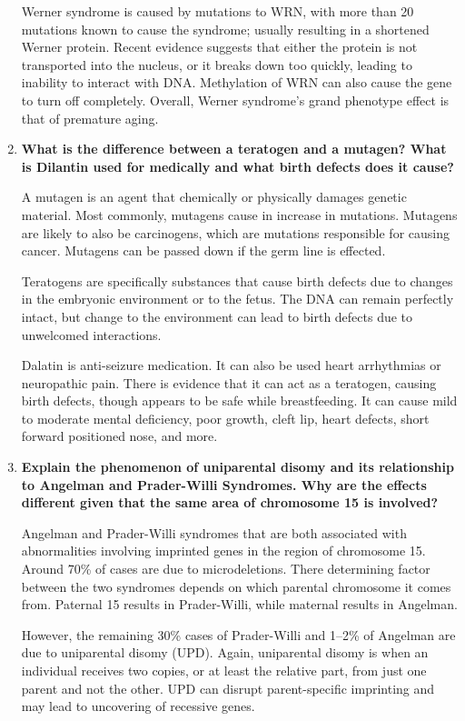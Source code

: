 \documentclass[plain,basic]{inVerba-notes}
\begin{document}
\begin{enumerate}
    Werner syndrome is caused by mutations to WRN, with more than 20 mutations known to cause the syndrome; usually resulting in a shortened Werner protein. Recent evidence suggests that either the protein is not transported into the nucleus, or it breaks down too quickly, leading to inability to interact with DNA\@. Methylation of WRN can also cause the gene to turn off completely. Overall, Werner syndrome's grand phenotype effect is that of premature aging.

    \qquad

    \item \textbf{What is the difference between a teratogen and a mutagen? What is Dilantin used for medically and what birth defects does it cause?}
    
    A mutagen is an agent that chemically or physically damages genetic material. Most commonly, mutagens cause in increase in mutations. Mutagens are likely to also be carcinogens, which are mutations responsible for causing cancer. Mutagens can be passed down if the germ line is effected. 

    Teratogens are specifically substances that cause birth defects due to changes in the embryonic environment or to the fetus. The DNA can remain perfectly intact, but change to the environment can lead to birth defects due to unwelcomed interactions. 

    Dalatin is anti-seizure medication. It can also be used heart arrhythmias or neuropathic pain. There is evidence that it can act as a teratogen, causing birth defects, though appears to be safe while breastfeeding. It can cause mild to moderate mental deficiency, poor growth, cleft lip, heart defects, short forward positioned nose, and more.

    \item \textbf{Explain the phenomenon of uniparental disomy and its relationship to Angelman and Prader-Willi Syndromes. Why are the effects different given that the same area of chromosome 15 is involved?}
    
    Angelman and Prader-Willi syndromes that are both associated with abnormalities involving imprinted genes in the region of chromosome 15. Around 70\% of cases are due to microdeletions. There determining factor between the two syndromes depends on which parental chromosome it comes from. Paternal 15 results in Prader-Willi, while maternal results in Angelman.

    However, the remaining 30\% cases of Prader-Willi and 1--2\% of Angelman are due to uniparental disomy (UPD). Again, uniparental disomy is when an individual receives two copies, or at least the relative part, from just one parent and not the other. UPD can disrupt parent-specific imprinting and may lead to uncovering of recessive genes.


\end{enumerate}
\end{document}
